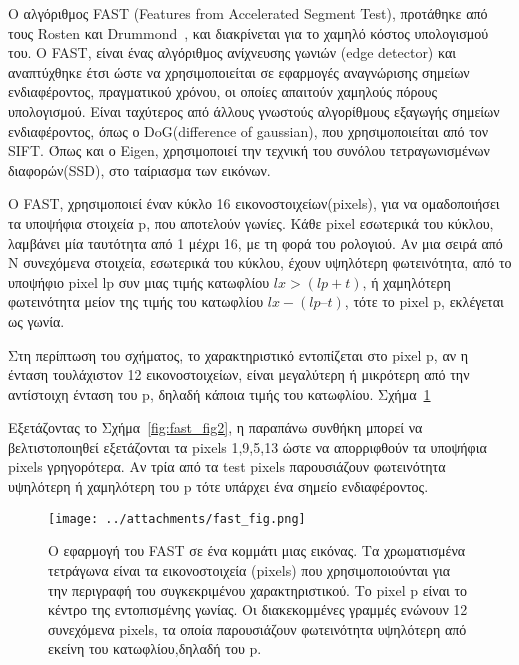  Ο αλγόριθμος FAST (Features from Accelerated Segment Test), προτάθηκε από τους Rosten και Drummond~\cite{rosten2005fusing},
και διακρίνεται για το χαμηλό κόστος υπολογισμού του. Ο FAST, είναι ένας αλγόριθμος ανίχνευσης γωνιών (edge detector) και αναπτύχθηκε έτσι ώστε να χρησιμοποιείται σε εφαρμογές αναγνώρισης σημείων ενδιαφέροντος, πραγματικού χρόνου, οι οποίες απαιτούν χαμηλούς πόρους υπολογισμού.
Είναι ταχύτερος από άλλους γνωστούς αλγορίθμους εξαγωγής σημείων ενδιαφέροντος,
όπως ο DoG(difference of gaussian), που χρησιμοποιείται από τον SIFT. Όπως και ο Eigen, χρησιμοποιεί την τεχνική του συνόλου τετραγωνισμένων διαφορών(SSD), στο ταίριασμα των εικόνων.\par
Ο FAST, χρησιμοποιεί έναν κύκλο 16 εικονοστοιχείων(pixels), για να ομαδοποιήσει τα υποψήφια στοιχεία p, που αποτελούν γωνίες. 
Kάθε pixel εσωτερικά του κύκλου, λαμβάνει μία ταυτότητα από 1 μέχρι 16,
με τη φορά του ρολογιού. Αν μια σειρά από Ν συνεχόμενα στοιχεία, εσωτερικά του κύκλου, 
έχουν υψηλότερη φωτεινότητα, από το υποψήφιο pixel lp συν μιας τιμής κατωφλίου $lx > (lp + t) $,
ή χαμηλότερη φωτεινότητα μείον της τιμής του κατωφλίου  $lx - (lp – t)$,
τότε το pixel p, εκλέγεται ως γωνία. \par
Στη περίπτωση του σχήματος, το χαρακτηριστικό εντοπίζεται στο pixel p, αν η ένταση τουλάχιστον 12 εικονοστοιχείων, είναι μεγαλύτερη ή μικρότερη από την αντίστοιχη ένταση του p,
δηλαδή κάποια τιμής του κατωφλίου. Σχήμα~\ref{fig:fast_fig} \par
Εξετάζοντας το Σχήμα~\ref{fig:fast_fig2}, η παραπάνω συνθήκη μπορεί να βελτιστοποιηθεί εξετάζονται τα pixels 1,9,5,13 ώστε να απορριφθούν τα υποψήφια pixels γρηγορότερα. 
Αν τρία από τα test pixels παρουσιάζουν φωτεινότητα υψηλότερη ή χαμηλότερη του p τότε υπάρχει ένα σημείο ενδιαφέροντος.


\newpage

\begin{figure}[!ht]
\begin{minipage}[b]{1.0\linewidth}
\centering
\texttt{[image: ../attachments/fast\_fig.png]}
\caption{O εφαρμογή του FAST σε ένα κομμάτι μιας εικόνας. Τα χρωματισμένα τετράγωνα είναι τα εικονοστοιχεία (pixels) που χρησιμοποιούνται για την περιγραφή του συγκεκριμένου χαρακτηριστικού. Το pixel p είναι το κέντρο της εντοπισμένης γωνίας. Οι διακεκομμένες γραμμές ενώνουν 12 συνεχόμενα pixels, τα οποία παρουσιάζουν φωτεινότητα υψηλότερη από εκείνη του κατωφλίου,δηλαδή του p.}
\label{fig:fast_fig}
\end{minipage}

 \end{figure} 

